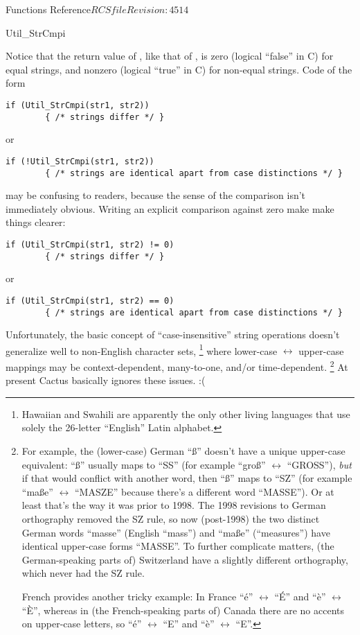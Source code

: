 \begin{cactuspart}{ Functions Reference}{$RCSfile$}{$Revision: 4514 $}
\begin{FunctionDescription}{Util\_StrCmpi}
\begin{Discussion}
Notice that the return value of , like that of
, is zero (logical ``false'' in C) for equal strings,
and nonzero (logical ``true'' in C) for non-equal strings.
Code of the form
\begin{verbatim}
if (Util_StrCmpi(str1, str2))
        { /* strings differ */ }
\end{verbatim}
or
\begin{verbatim}
if (!Util_StrCmpi(str1, str2))
        { /* strings are identical apart from case distinctions */ }
\end{verbatim}
may be confusing to readers, because the sense of the comparison
isn't immediately obvious.  Writing an explicit comparison against zero
make make things clearer:
\begin{verbatim}
if (Util_StrCmpi(str1, str2) != 0)
        { /* strings differ */ }
\end{verbatim}
or
\begin{verbatim}
if (Util_StrCmpi(str1, str2) == 0)
        { /* strings are identical apart from case distinctions */ }
\end{verbatim}

Unfortunately, the basic concept of ``case-insensitive'' string
operations doesn't generalize well to non-English character sets,%
\footnote{%
	 Hawaiian and Swahili are apparently the only
	 other living languages that use solely the
	 26-letter ``English'' Latin alphabet.
	 }%
{} where lower-case $\leftrightarrow$ upper-case mappings may be
context-dependent, many-to-one, and/or time-dependent.%
\footnote{%
	 For example, the (lower-case) German ``\ss''
	 doesn't have a unique upper-case equivalent:
	 ``\ss'' usually maps to ``SS''
	 (for example ``gro\ss'' $\leftrightarrow$ ``GROSS''),
	 {\em but\/} if that would conflict
	 with another word, then ``\ss'' maps to ``SZ''
	 (for example ``ma\ss{}e'' $\leftrightarrow$ ``MASZE''
	 because there's a different word ``MASSE'').
	 Or at least that's the way it was prior to 1998.
	 The 1998 revisions to German orthography
	 removed the SZ rule, so now (post-1998) the two
	 distinct German words ``masse'' (English ``mass'')
	 and ``ma\ss{}e'' (``measures'') have identical
	 upper-case forms ``MASSE''.  To further complicate
	 matters, (the German-speaking parts of) Switzerland
	 have a slightly different orthography, which never
	 had the SZ rule.

	 French provides another tricky example:
	 In France ``\'e'' $\leftrightarrow$ ``\'E'' and
	 ``\`e'' $\leftrightarrow$ ``\`E'',
	 whereas in (the French-speaking parts of) Canada
	 there are no accents on upper-case letters, so
	 ``\'e'' $\leftrightarrow$ ``E'' and
	 ``\`e'' $\leftrightarrow$ ``E''.
	 }%
{}  At present Cactus basically ignores these issues. :(
\end{Discussion}


\end{FunctionDescription}
\end{cactuspart}
